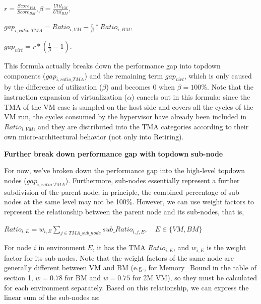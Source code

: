 \documentclass[12pt]{article}
\newcommand{\npar}[1]{#1\par}
\newcommand{\dmath}[1]{{\centering $\displaystyle #1$\par}}
\newcommand{\emptypar}{\mbox{}\par}
\newcommand{\numpara}[4]{{\hangindent=#1\relax\hangafter=1\relax
  \noindent\hspace*{\dimexpr#1-#2\relax}\makebox[#2][l]{#3}#4\par}}
\begin{document}
\dmath{\mathit{r}=\frac{\mathit{Scor}{\mathit{e}}_{\mathit{VM}}}{\mathit{Scor}{\mathit{e}}_{\mathit{BM}}},\beta =\frac{\mathit{Uti}{\mathit{l}}_{\mathit{VM}}}{\mathit{Uti}{\mathit{l}}_{\mathit{BM}}},}
\dmath{\mathit{ga}{\mathit{p}}_{\mathit{i},\mathit{ratio\_TMA}}=\mathit{Rati}{\mathit{o}}_{\mathit{i},\mathit{VM}}-\frac{\mathit{r}}{\beta }*\mathit{Rati}{\mathit{o}}_{\mathit{i},\mathit{BM}},}
\dmath{{\mathit{gap}}_{\mathit{virt}}=\mathit{r}*\left( \frac{1}{\beta }-1 \right).}
\npar{\hspace*{4\fontdimen2\font}This formula actually breaks down the performance gap into topdown components (${\mathit{gap}}_{\mathit{i},\mathit{ratio\_TMA}}$) and the remaining term ${\mathit{gap}}_{\mathit{virt}}$, which is only caused by the difference of utilization ($\beta $) and becomes 0 when $\beta =100\%$. Note that the instruction expansion of virtualization ($\alpha $) cancels out in this formula: since the TMA of the VM case is sampled on the host side and covers all the cycles of the VM run, the cycles consumed by the hypervisor have already been included in ${\mathit{Ratio}}_{\mathit{i},\mathit{VM}}$, and they are distributed into the TMA categories according to their own micro-architectural behavior (not only into Retiring).}
\emptypar
\numpara{18.00pt}{18.00pt}{\textbf{(4)}}{\textbf{Further break down performance gap with }\textbf{topdown}\textbf{ sub}\textbf{-}\textbf{node}}
\npar{\hspace*{4\fontdimen2\font}For now, we’ve broken down the performance gap into the high-level topdown nodes ($\mathit{ga}{\mathit{p}}_{\mathit{i},\mathit{ratio\_TMA}}$). Furthermore, sub-nodes essentially represent a further subdivision of the parent node; in principle, the combined percentage of sub-nodes at the same level may not be 100\%. However, we can use weight factors to represent the relationship between the parent node and its sub-nodes, that is,}
\dmath{{\mathit{Ratio}}_{\mathit{i},\mathit{E}}={\mathit{w}}_{\mathit{i},\mathit{E}}\sum\limits_{\mathit{j}\in \mathit{TMA\_sub\_node}}{{\mathit{sub\_Ratio}}_{\mathit{i},\mathit{j},\mathit{E}}},\quad \mathit{E}\in \{\mathit{VM},\mathit{BM}\}}
\npar{\hspace*{4\fontdimen2\font}For node $\mathit{i}$ in environment $\mathit{E}$, it has the TMA ${\mathit{Ratio}}_{\mathit{i},\mathit{E}}$, and ${\mathit{w}}_{\mathit{i},\mathit{E}}$ is the weight factor for its sub-nodes. Note that the weight factors of the same node are generally different between VM and BM (e.g., for Memory\_Bound in the table of section 1, $\mathit{w}=0.78$ for BM and $\mathit{w}=0.75$ for 2M VM), so they must be calculated for each environment separately. Based on this relationship, we can express the linear sum of the sub-nodes as:}
\end{document}
